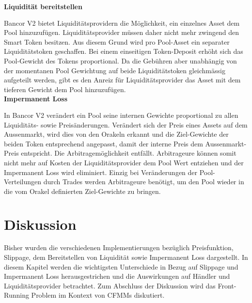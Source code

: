 \documentclass[12pt,a4paper,titlepage,oneside,english]{article}
\begin{document}

\textbf{Liquidität bereitstellen}

Bancor V2 bietet Liquiditätsprovidern die Möglichkeit, ein einzelnes Asset dem Pool hinzuzufügen. Liquiditätsprovider müssen daher nicht mehr zwingend den Smart Token besitzen. Aus diesem Grund wird pro Pool-Asset ein separater Liquiditätstoken geschaffen. Bei einem einseitigen Token-Deposit erhöht sich das Pool-Gewicht des Tokens proportional. Da die Gebühren aber unabhängig von der momentanen Pool Gewichtung auf beide Liquiditätstoken gleichmässig aufgeteilt werden, gibt es den Anreiz für Liquiditätsprovider das Asset mit dem tieferen Gewicht dem Pool hinzuzufügen. \citep[vgl.][]{Shachav2020} \\

\textbf{Impermanent Loss}

In Bancor V2 verändert ein Pool seine internen Gewichte proportional zu allen Liquiditäts- sowie Preisänderungen. Verändert sich der Preis eines Assets auf dem Aussenmarkt, wird dies von den Orakeln erkannt und die Ziel-Gewichte der beiden Token entsprechend angepasst, damit der interne Preis dem Aussenmarkt-Preis entspricht. Die Arbitragemöglichkeit entfällt. Arbitrageure können somit nicht mehr auf Kosten der Liquiditätsprovider dem Pool Wert entziehen und der Impermanent Loss wird eliminiert. Einzig bei Veränderungen der Pool-Verteilungen durch Trades werden Arbitrageure benötigt, um den Pool wieder in die vom Orakel definierten Ziel-Gewichte zu bringen. \citep[vgl.][]{Chainlink2020} 

\section{Diskussion}
Bisher wurden die verschiedenen Implementierungen bezüglich Preisfunktion, Slippage, dem Bereitstellen von Liquidität sowie Impermanent Loss dargestellt. In diesem Kapitel werden die wichtigsten Unterschiede in Bezug auf Slippage und Impermanent Loss herausgestrichen und die Auswirkungen auf Händler und Liquiditätsprovider betrachtet. %
Zum Abschluss der Diskussion wird das Front-Running Problem im Kontext von CFMMs diskutiert.\\
\end{document}
